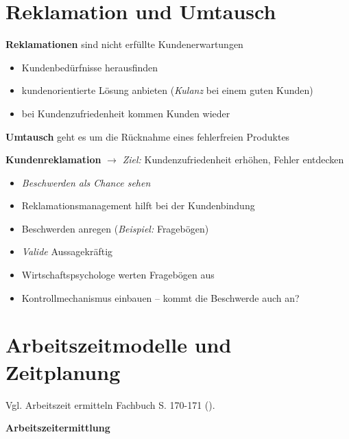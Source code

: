 \newpage

\section{Reklamation und Umtausch}\label{reklamation-und-umtausch}

\textbf{Reklamationen} sind nicht erfüllte Kundenerwartungen

\begin{itemize}
\item
  Kundenbedürfnisse herausfinden
\item
  kundenorientierte Lösung anbieten (\emph{Kulanz} bei einem guten
  Kunden)
\item
  bei Kundenzufriedenheit kommen Kunden wieder
\end{itemize}

\textbf{Umtausch} geht es um die Rücknahme eines fehlerfreien Produktes

\textbf{Kundenreklamation} $\to$ \emph{Ziel:} Kundenzufriedenheit
erhöhen, Fehler entdecken

\begin{itemize}
\item
  \emph{Beschwerden als Chance sehen}
\item
  Reklamationsmanagement hilft bei der Kundenbindung
\item
  Beschwerden anregen (\emph{Beispiel:} Fragebögen)
\item
  \emph{Valide} Aussagekräftig
\item
  Wirtschaftspsychologe werten Fragebögen aus
\item
  Kontrollmechanismus einbauen -- kommt die Beschwerde auch an?
\end{itemize}

\newpage

\section{Arbeitszeitmodelle und
Zeitplanung}\label{arbeitszeitmodelle-und-zeitplanung}

Vgl. Arbeitszeit ermitteln Fachbuch S. 170-171
(\textcite{heiser:2017:betriebsfuhrung}).

\textbf{Arbeitszeitermittlung}

